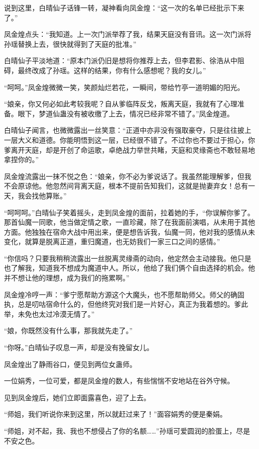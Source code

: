 \begin{this_body}
说到这里，白晴仙子话锋一转，凝神看向凤金煌：“这一次的名单已经批示下来了。”

凤金煌点头：“我知道。上一次门派举荐了我，结果天庭没有音讯。这一次门派将孙瑶替换上去，很快就得到了天庭的批准。”

白晴仙子平淡地道：“原本门派仍旧是想将你推荐上去，但李君影、徐浩从中阻碍，最终改成了孙瑶。这样的结果，你有什么感想呢？我的女儿。”

“呵呵。”凤金煌微微一笑，笑颜灿烂若花，一瞬间，带给竹亭一道明媚的阳光。

“娘亲，你又何必如此考较我呢？自从爹临阵反戈，叛离天庭，我就有了心理准备。眼下，梦道仙蛊没有被收缴了上去，情况已经非常不错了。”凤金煌道。

白晴仙子闻言，也微微露出一丝笑意：“正道中亦非没有强取豪夺，只是往往披上一层大义和道德。你能明悟到这一层，已经很不错了。不过你也不要过于担心，你爹离开天庭，却是开创了命运歌，卓绝战力举世共睹，天庭和灵缘斋也不敢轻易地拿捏你的。”

凤金煌流露出一抹不悦之色：“娘亲，你不必为爹说话了。我虽然能理解爹，但我不会原谅他。他忽然间背离天庭，根本不提前告知我们，这就是抛妻弃女！总有一天，我会找他算账。”

“呵呵呵。”白晴仙子笑着摇头，走到凤金煌的面前，拉着她的手，“你误解你爹了。那首仙魔一同歌，他当做定情之歌，一直珍藏，除了在我面前演唱，从未用于其他方面。他独独在宿命大战中用出来，便是想告诉我，仙魔一同，他对我的感情从未变化，就算是脱离正道，重归魔道，也无妨我们一家三口之间的感情。”

“你信吗？只要我稍稍流露出一丝脱离灵缘斋的动向，他定然会主动接我。他只是也了解我，知道我不想成为魔道中人。所以，他给了我们俩个自由选择的机会。他并不想让他的理想，成为我们的拖累啊。”

凤金煌冷哼一声：“爹宁愿帮助方源这个大魔头，也不愿帮助师父。师父的确固执，总是叨咕宿命什么的，但他终究对我们是一片好心，真正为我着想的。爹此举，未免也太过冷漠无情了。”

“娘，你既然没有什么事，那我就先走了。”

“你呀。”白晴仙子叹息一声，却是没有挽留女儿。

凤金煌出了静雨谷口，便见到两位女蛊师。

一位娟秀，一位可爱，都是凤金煌的数人，有些惴惴不安地站在谷外守候。

见到凤金煌后，她们立即面露喜色，迎了上去。

“师姐，我们听说你来到这里，所以就赶过来了！”面容娟秀的便是秦娟。

“师姐，对不起，我、我也不想侵占了你的名额……”孙瑶可爱圆润的脸蛋上，尽是不安之色。


\end{this_body}
